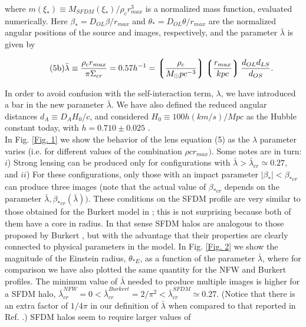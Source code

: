 \documentclass[10pt,letterpaper,twocolumn]{article}
\begin{document}
where $m(\xi_{*})\equiv M_{SFDM}(\xi_{*})/\rho_{c}{r^{3}_{max}}$ is a normalized mass function, evaluated numerically. Here $ \beta_{*}= D_{OL}\beta/r_{max}$ and $\theta_{*}= D_{OL}\theta/r_{max}$ are the normalized angular positions of the source and images, respectively, and the parameter $\bar{\lambda}$ is given by

\begin{equation}
\tag{5b}\label{eq:5b}\small
\bar{\lambda}\equiv\frac{\rho_{c}r_{max}}{\pi\Sigma_{cr}}=0.57h^{-1}=\left\lgroup\frac{\rho_{c}}{M_{\odot}pc^{-3}}\right\rgroup\left\lgroup\frac{r_{max}}{kpc}\right\rgroup\frac{d_{OL}d_{LS}}{d_{OS}}.
\end{equation}

In order to avoid confusion with the self-interaction term, $\lambda$, we have introduced a bar in the new parameter $\bar{\lambda}$. We have also defined the reduced angular distances $d_{A}\equiv D_{A}H_{0}/c$, and considered $H_{0}\equiv100h(km/s)/Mpc$ as the Hubble constant today, with $h = 0.710\pm0.025$ \cite{14}.\\
In Fig. \ref{Fig. 1} we show the behavior of the lens equation (5) as the $\lambda$ parameter varies (i.e. for different values of the combination $\rho c r_{max})$. Some notes are in turn: $i$) Strong lensing can be produced only for configurations with $\bar{\lambda} > \bar{\lambda}_{cr} \simeq 0.27$, and $ii$) For these configurations, only those with an impact parameter $|\beta_{*}|<\beta_{*cr}$ can produce three images (note that the actual value of $\beta_{*cr}$ depends on the parameter $\bar{\lambda}, \beta_{*cr}(\bar{\lambda}))$.
These conditions on the SFDM profile are very similar to those obtained for the Burkert model in \cite{15}; this is not surprising because both of them have a core in radius. In that sense SFDM halos are analogous to those proposed by Burkert \cite{16}, but with the advantage that their properties are clearly connected to physical parameters in the model. 
In Fig. \ref{Fig. 2} we show the magnitude of the Einstein radius, $\theta_{*E}$, as a function of the parameter $\bar{\lambda}$, where for comparison we have also plotted the same quantity for the NFW \cite{17} and Burkert \cite{15} profiles. The minimum value of $\bar{\lambda}$ needed to produce multiple images is higher for a SFDM halo, $\bar{\lambda}^{NFW}_{cr} = 0 < \bar{\lambda}^{Burkert}_{cr} = 2/\pi^{2} < \bar{\lambda}^{SFDM}_{cr}\simeq0.27$. (Notice that there is an extra factor of $1/4\pi$ in our definition of $\bar{\lambda}$ when compared to that reported in Ref. \cite{15}.) SFDM halos seem to require larger values of
\end{document}

